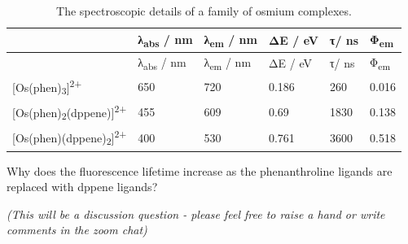 \documentclass[
]{book}
\begin{document}
\begin{longtable}[]{@{}llllll@{}}
\caption{\label{tab:osphen} The spectroscopic details of a family of osmium complexes.}\tabularnewline
\toprule
& λ\textsubscript{abs} / nm & λ\textsubscript{em} / nm & ΔE / eV & τ/ ns & Φ\textsubscript{em}\tabularnewline
\midrule
\endfirsthead
\toprule
& λ\textsubscript{abs} / nm & λ\textsubscript{em} / nm & ΔE / eV & τ/ ns & Φ\textsubscript{em}\tabularnewline
\midrule
\endhead
{[}Os(phen)\textsubscript{3}{]}\textsuperscript{2+} & 650 & 720 & 0.186 & 260 & 0.016\tabularnewline
{[}Os(phen)\textsubscript{2}(dppene){]}\textsuperscript{2+} & 455 & 609 & 0.69 & 1830 & 0.138\tabularnewline
{[}Os(phen)(dppene)\textsubscript{2}{]}\textsuperscript{2+} & 400 & 530 & 0.761 & 3600 & 0.518\tabularnewline
\bottomrule
\end{longtable}

Why does the fluorescence lifetime increase as the phenanthroline ligands are replaced with dppene ligands?

\emph{(This will be a discussion question - please feel free to raise a hand or write comments in the zoom chat)}

  
\end{document}
